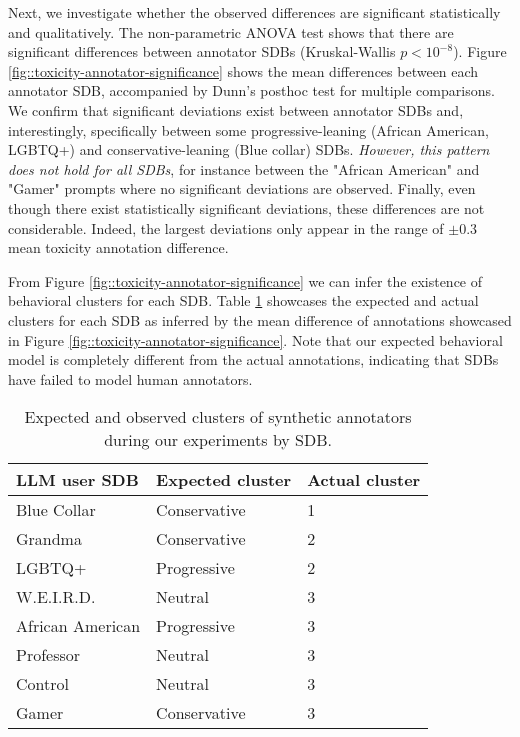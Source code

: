 Next, we investigate whether the observed differences are significant statistically and qualitatively. The non-parametric ANOVA test shows that there are significant differences between annotator \acp{SDB} (Kruskal-Wallis $p<10^{-8}$). Figure \ref{fig::toxicity-annotator-significance} shows the mean differences between each annotator \ac{SDB}, accompanied by Dunn's posthoc test for multiple comparisons. We confirm that significant deviations exist between annotator \acp{SDB} and, interestingly, specifically between some progressive-leaning (African American, LGBTQ+) and conservative-leaning (Blue collar) \acp{SDB}. \textit{However, this pattern does not hold for all \acp{SDB}}, for instance between the "African American" and "Gamer" prompts where no significant deviations are observed. Finally, even though there exist statistically significant deviations, these differences are not considerable. Indeed, the largest deviations only appear in the range of $\pm 0.3$ mean toxicity annotation difference.

From Figure \ref{fig::toxicity-annotator-significance} we can infer the existence of behavioral clusters for each \ac{SDB}. Table \ref{tab:annotator-sdb-behavior} showcases the expected and actual clusters for each \ac{SDB} as inferred by the mean difference of annotations showcased in Figure \ref{fig::toxicity-annotator-significance}. Note that our expected behavioral model is completely different from the actual annotations, indicating that \acp{SDB} have failed to model human annotators.


\begin{table}
	\begin{tabular}
		{ |p{3cm}|p{3cm}|p{3cm}|}
		\hline
		\cellcolor{blue!25}\textbf{LLM user SDB} & \cellcolor{blue!25}\textbf{Expected cluster} & \cellcolor{blue!25}\textbf{Actual cluster}\\
		\hline
		Blue Collar & Conservative & 1 \\
		\hline
		Grandma & Conservative & 2\\
		\hline
		LGBTQ+ & Progressive & 2\\
		\hline
		\ac{W.E.I.R.D.} & Neutral & 3\\
		\hline
		African American & Progressive & 3\\
		\hline
		Professor & Neutral & 3\\
		\hline
		Control & Neutral & 3\\
		\hline
		Gamer & Conservative & 3\\
		\hline
	\end{tabular}
	\caption{Expected and observed clusters of synthetic annotators during our experiments by \ac{SDB}.}
	\label{tab:annotator-sdb-behavior}
\end{table}

